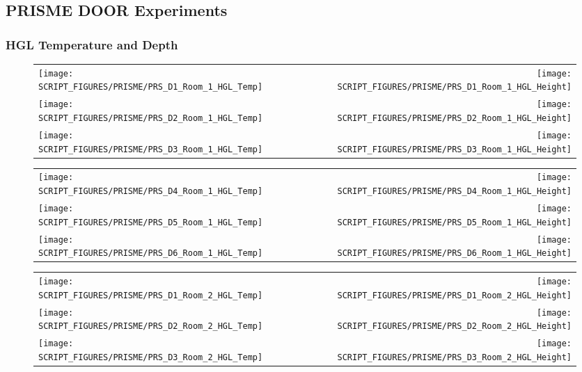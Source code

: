 \clearpage


\subsection{PRISME DOOR Experiments}

\subsubsection{HGL Temperature and Depth}

\begin{figure}[!ht]
\begin{tabular*}{\textwidth}{l@{\extracolsep{\fill}}r}
\texttt{[image: SCRIPT\_FIGURES/PRISME/PRS\_D1\_Room\_1\_HGL\_Temp]} &
\texttt{[image: SCRIPT\_FIGURES/PRISME/PRS\_D1\_Room\_1\_HGL\_Height]} \\
\texttt{[image: SCRIPT\_FIGURES/PRISME/PRS\_D2\_Room\_1\_HGL\_Temp]} &
\texttt{[image: SCRIPT\_FIGURES/PRISME/PRS\_D2\_Room\_1\_HGL\_Height]} \\
\texttt{[image: SCRIPT\_FIGURES/PRISME/PRS\_D3\_Room\_1\_HGL\_Temp]} &
\texttt{[image: SCRIPT\_FIGURES/PRISME/PRS\_D3\_Room\_1\_HGL\_Height]}
\end{tabular*}
\label{PRISME_HGL_1}
\end{figure}

\begin{figure}[p]
\begin{tabular*}{\textwidth}{l@{\extracolsep{\fill}}r}
\texttt{[image: SCRIPT\_FIGURES/PRISME/PRS\_D4\_Room\_1\_HGL\_Temp]} &
\texttt{[image: SCRIPT\_FIGURES/PRISME/PRS\_D4\_Room\_1\_HGL\_Height]} \\
\texttt{[image: SCRIPT\_FIGURES/PRISME/PRS\_D5\_Room\_1\_HGL\_Temp]} &
\texttt{[image: SCRIPT\_FIGURES/PRISME/PRS\_D5\_Room\_1\_HGL\_Height]} \\
\texttt{[image: SCRIPT\_FIGURES/PRISME/PRS\_D6\_Room\_1\_HGL\_Temp]} &
\texttt{[image: SCRIPT\_FIGURES/PRISME/PRS\_D6\_Room\_1\_HGL\_Height]}
\end{tabular*}
\label{PRISME_HGL_2}
\end{figure}

\begin{figure}[p]
\begin{tabular*}{\textwidth}{l@{\extracolsep{\fill}}r}
\texttt{[image: SCRIPT\_FIGURES/PRISME/PRS\_D1\_Room\_2\_HGL\_Temp]} &
\texttt{[image: SCRIPT\_FIGURES/PRISME/PRS\_D1\_Room\_2\_HGL\_Height]} \\
\texttt{[image: SCRIPT\_FIGURES/PRISME/PRS\_D2\_Room\_2\_HGL\_Temp]} &
\texttt{[image: SCRIPT\_FIGURES/PRISME/PRS\_D2\_Room\_2\_HGL\_Height]} \\
\texttt{[image: SCRIPT\_FIGURES/PRISME/PRS\_D3\_Room\_2\_HGL\_Temp]} &
\texttt{[image: SCRIPT\_FIGURES/PRISME/PRS\_D3\_Room\_2\_HGL\_Height]}
\end{tabular*}
\label{PRISME_HGL_3}
\end{figure}

